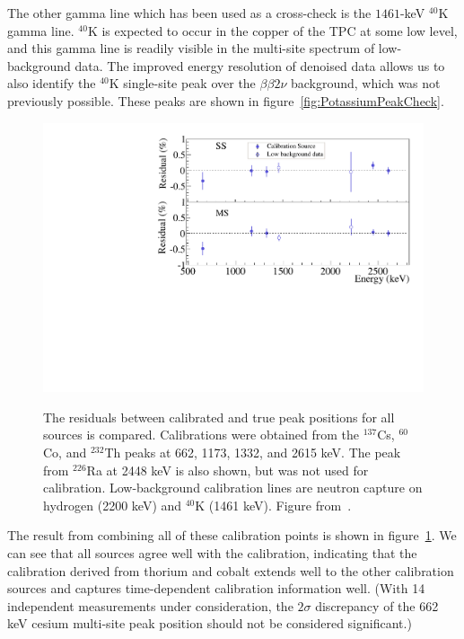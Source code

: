 The other gamma line which has been used as a cross-check is the $1461$-keV $^{40}$K gamma line.  $^{40}$K is expected to occur in the copper of the TPC at some low level, and this gamma line is readily visible in the multi-site spectrum of low-background data.  The improved energy resolution of denoised data allows us to also identify the $^{40}$K single-site peak over the $\beta\beta 2\nu$ background, which was not previously possible.  These peaks are shown in figure~\ref{fig:PotassiumPeakCheck}.

\begin{figure}
\begin{center}
\includegraphics[keepaspectratio=true,width=\textwidth]{residual_bb0n_denoised.pdf}
\end{center}
\renewcommand{\baselinestretch}{1}
\small\normalsize
\begin{quote}
\caption{The residuals between calibrated and true peak positions for all sources is compared.  Calibrations were obtained from the $^{137}$Cs, $^{60}$Co, and $^{232}$Th peaks at 662, 1173, 1332, and 2615 keV.  The peak from $^{226}$Ra at 2448 keV is also shown, but was not used for calibration.  Low-background calibration lines are neutron capture on hydrogen (2200 keV) and $^{40}$K (1461 keV).  Figure from~\cite{EnergyDocumentRun2ab}.}
\label{fig:CalibResidualsForManySources}
\end{quote}
\end{figure}
\renewcommand{\baselinestretch}{2}
\small\normalsize

The result from combining all of these calibration points is shown in figure~\ref{fig:CalibResidualsForManySources}.  We can see that all sources agree well with the calibration, indicating that the calibration derived from thorium and cobalt extends well to the other calibration sources and captures time-dependent calibration information well.  (With 14 independent measurements under consideration, the $2\sigma$ discrepancy of the 662 keV cesium multi-site peak position should not be considered significant.)

